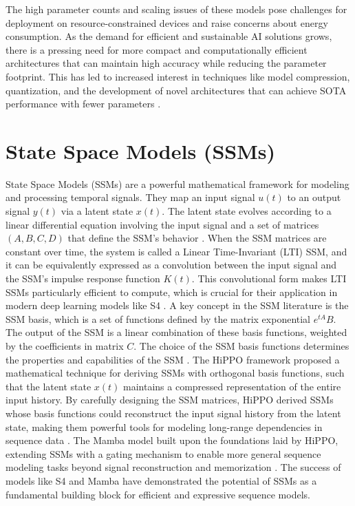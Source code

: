 \documentclass[conference]{IEEEtran}
\begin{document}
The high parameter counts and scaling issues of these models pose challenges for deployment on resource-constrained devices and raise concerns about energy consumption. As the demand for efficient and sustainable AI solutions grows, there is a pressing need for more compact and computationally efficient architectures that can maintain high accuracy while reducing the parameter footprint. This has led to increased interest in techniques like model compression, quantization, and the development of novel architectures that can achieve SOTA performance with fewer parameters \cite{cheng2017survey, hinton2015distilling}.

\section{State Space Models (SSMs)}
State Space Models (SSMs) are a powerful mathematical framework for modeling and processing temporal signals. They map an input signal $u(t)$ to an output signal $y(t)$ via a latent state $x(t)$. The latent state evolves according to a linear differential equation involving the input signal and a set of matrices $(A, B, C, D)$ that define the SSM's behavior \cite{gu2022efficiently}.
When the SSM matrices are constant over time, the system is called a Linear Time-Invariant (LTI) SSM, and it can be equivalently expressed as a convolution between the input signal and the SSM's impulse response function $K(t)$. This convolutional form makes LTI SSMs particularly efficient to compute, which is crucial for their application in modern deep learning models like S4 \cite{gu2022efficiently}.
A key concept in the SSM literature is the SSM basis, which is a set of functions defined by the matrix exponential $e^{tA}B$. The output of the SSM is a linear combination of these basis functions, weighted by the coefficients in matrix $C$. The choice of the SSM basis functions determines the properties and capabilities of the SSM \cite{gu2022efficiently}.
The HiPPO framework proposed a mathematical technique for deriving SSMs with orthogonal basis functions, such that the latent state $x(t)$ maintains a compressed representation of the entire input history. By carefully designing the SSM matrices, HiPPO derived SSMs whose basis functions could reconstruct the input signal history from the latent state, making them powerful tools for modeling long-range dependencies in sequence data \cite{gu2020hippo}.
The Mamba model built upon the foundations laid by HiPPO, extending SSMs with a gating mechanism to enable more general sequence modeling tasks beyond signal reconstruction and memorization \cite{gu2023mamba}. The success of models like S4 and Mamba have demonstrated the potential of SSMs as a fundamental building block for efficient and expressive sequence models.
\end{document}
